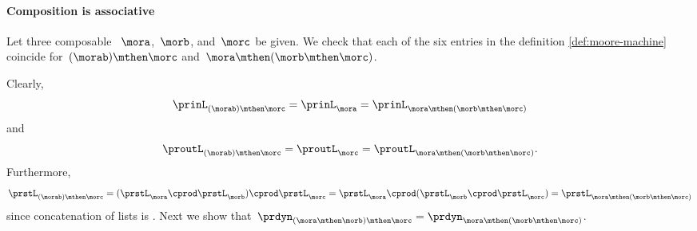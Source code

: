 \paragraph{Composition is associative}

Let three composable ~$\mora$,~$\morb$, and~$\morc$ be given.
We check that each of the six entries in the definition \cref{def:moore-machine} coincide for~$(\morab) \mthen \morc$ and~$\mora \mthen (\morb \mthen \morc)$.

Clearly,
\begin{equation}
    \label{eq:moore_assoc_input}
    \prinL_{(\morab)\mthen \morc} = \prinL_{\mora} =\prinL_{\mora \mthen (\morb \mthen \morc)}
\end{equation}
and
\begin{equation}
    \label{eq:moore_assoc_output}
    \proutL_{(\morab)\mthen \morc} =\proutL_\morc = \proutL_{\mora \mthen (\morb \mthen \morc)}.
\end{equation}
Furthermore,
\begin{equation}
    \label{eq:moore_assoc_state}
    \prstL_{(\morab)\mthen \morc} = (\prstL_{\mora} \cprod \prstL_{\morb}) \cprod \prstL_{\morc} = \prstL_{\mora} \cprod (\prstL_{\morb} \cprod \prstL_{\morc}) =\prstL_{\mora \mthen (\morb \mthen \morc)}
\end{equation}
since concatenation of lists is .
Next we show that~$\prdyn_{(\mora \mthen \morb)\mthen \morc} = \prdyn_{\mora \mthen (\morb \mthen \morc)}$.

